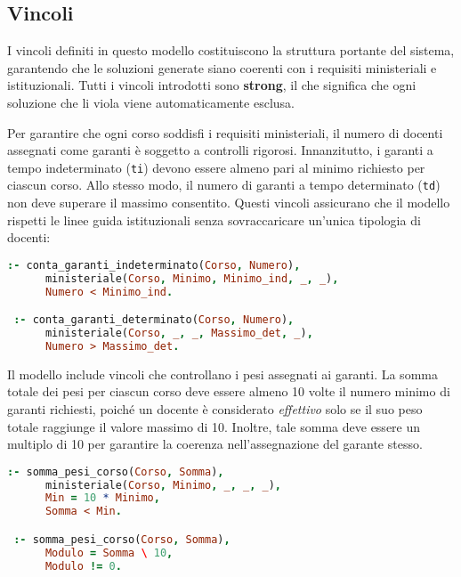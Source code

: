 \subsection{Vincoli}\label{sec:constraints}

I vincoli definiti in questo modello costituiscono la struttura portante del sistema, garantendo 
che le soluzioni generate siano coerenti con i requisiti ministeriali e istituzionali. 
Tutti i vincoli introdotti sono \textbf{strong}, il che significa che ogni soluzione che li 
viola viene automaticamente esclusa. 

Per garantire che ogni corso soddisfi i requisiti ministeriali, il numero di docenti assegnati 
come garanti è soggetto a controlli rigorosi. Innanzitutto, i garanti a tempo indeterminato 
(\texttt{ti}) devono essere almeno pari al minimo richiesto per ciascun corso. Allo stesso modo, 
il numero di garanti a tempo determinato (\texttt{td}) non deve superare il massimo consentito. 
Questi vincoli assicurano che il modello rispetti le linee guida istituzionali senza 
sovraccaricare un’unica tipologia di docenti:

\begin{lstlisting}[language=prolog, caption={Vincoli su garanti a tempo indeterminato e determinato.}]
 :- conta_garanti_indeterminato(Corso, Numero),
      ministeriale(Corso, Minimo, Minimo_ind, _, _),
      Numero < Minimo_ind.

 :- conta_garanti_determinato(Corso, Numero),
      ministeriale(Corso, _, _, Massimo_det, _),
      Numero > Massimo_det.
\end{lstlisting}

Il modello include vincoli che controllano i pesi assegnati ai garanti. La somma totale dei 
pesi per ciascun corso deve essere almeno 10 volte il numero minimo di garanti richiesti, 
poiché un docente è considerato \textit{effettivo} solo se il suo peso totale raggiunge il valore 
massimo di 10. Inoltre, tale somma deve essere un multiplo di 10 per garantire la coerenza 
nell’assegnazione del garante stesso.

\begin{lstlisting}[language=prolog, caption={Vincoli sui pesi assegnati ai garanti.}]
 :- somma_pesi_corso(Corso, Somma),
      ministeriale(Corso, Minimo, _, _, _),
      Min = 10 * Minimo,
      Somma < Min.

 :- somma_pesi_corso(Corso, Somma),
      Modulo = Somma \ 10,
      Modulo != 0.
\end{lstlisting}

